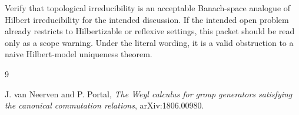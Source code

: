 \documentclass[11pt]{article}
\begin{document}
Verify that topological irreducibility is an acceptable Banach-space analogue
of Hilbert irreducibility for the intended discussion. If the intended open
problem already restricts to Hilbertizable or reflexive settings, this packet
should be read only as a scope warning. Under the literal wording, it is a
valid obstruction to a naive Hilbert-model uniqueness theorem.

\begin{thebibliography}{9}

J. van Neerven and P. Portal,
\emph{The Weyl calculus for group generators satisfying the canonical
commutation relations},
arXiv:1806.00980.

\end{thebibliography}
\end{document}
